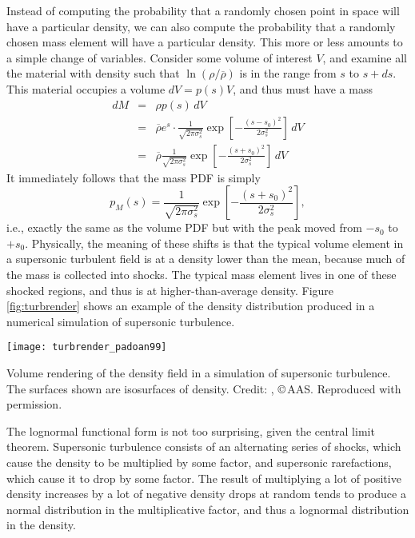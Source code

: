 Instead of computing the probability that a randomly chosen point in space will have a particular density, we can also compute the probability that a randomly chosen mass element will have a particular density. This more or less amounts to a simple change of variables. Consider some volume of interest $V$, and examine all the material with density such that $\ln(\rho/\overline{\rho})$ is in the range from $s$ to $s+ds$. This material occupies a volume $dV = p(s) V$, and thus must have a mass
\begin{eqnarray}
dM & = & \rho p(s) \, dV \\
& = & \overline{\rho} e^s \cdot \frac{1}{\sqrt{2\pi \sigma_s^2}} \exp\left[-\frac{(s-s_0)^2}{2\sigma_s^2}\right]\,  dV \\
& = & \overline{\rho} \frac{1}{\sqrt{2\pi \sigma_s^2}} \exp\left[-\frac{(s+s_0)^2}{2\sigma_s^2}\right]\,  dV
\end{eqnarray}
It immediately follows that the mass PDF is simply
\begin{equation}
p_M(s) = \frac{1}{\sqrt{2\pi \sigma_s^2}} \exp\left[-\frac{(s+s_0)^2}{2\sigma_s^2}\right],
\end{equation}
i.e., exactly the same as the volume PDF but with the peak moved from $-s_0$ to $+s_0$. Physically, the meaning of these shifts is that the typical volume element in a supersonic turbulent field is at a density lower than the mean, because much of the mass is collected into shocks. The typical mass element lives in one of these shocked regions, and thus is at higher-than-average density. Figure \ref{fig:turbrender} shows an example of the density distribution produced in a numerical simulation of supersonic turbulence.
\begin{marginfigure}
\texttt{[image: turbrender\_padoan99]}
\caption[Volume rendering of the density field for supersonic turbulence]{
\label{fig:turbrender}
Volume rendering of the density field in a simulation of supersonic turbulence. The surfaces shown are isosurfaces of density. Credit: \citet{padoan99a}, \copyright\,AAS. Reproduced with permission.
}
\end{marginfigure}

The lognormal functional form is not too surprising, given the central limit theorem. Supersonic turbulence consists of an alternating series of shocks, which cause the density to be multiplied by some factor, and supersonic rarefactions, which cause it to drop by some factor. The result of multiplying a lot of positive density increases by a lot of negative density drops at random tends to produce a normal distribution in the multiplicative factor, and thus a lognormal distribution in the density.

